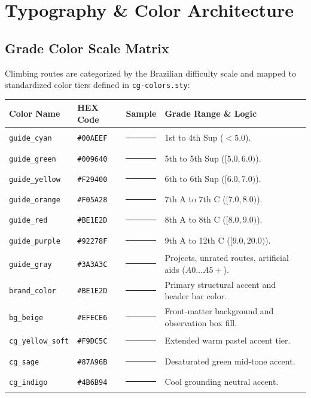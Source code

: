 \clearpage
\section{Typography \& Color Architecture}

\subsection{Grade Color Scale Matrix}
Climbing routes are categorized by the Brazilian difficulty scale and mapped to standardized color tiers defined in \texttt{cg-colors.sty}:

\vspace{0.5em}
\noindent
{\small
\begin{tabularx}{\linewidth}{@{}llcX@{}}
\toprule
\textbf{Color Name} & \textbf{HEX Code} & \textbf{Sample} & \textbf{Grade Range \& Logic} \\
\midrule
\texttt{guide\_cyan}   & \texttt{\#00AEEF} & \textcolor{guide_cyan}{\rule{14mm}{3mm}}   & 1st to 4th Sup ($< 5.0$). \\
\texttt{guide\_green}  & \texttt{\#009640} & \textcolor{guide_green}{\rule{14mm}{3mm}}  & 5th to 5th Sup ($[5.0, 6.0)$). \\
\texttt{guide\_yellow} & \texttt{\#F29400} & \textcolor{guide_yellow}{\rule{14mm}{3mm}} & 6th to 6th Sup ($[6.0, 7.0)$). \\
\texttt{guide\_orange} & \texttt{\#F05A28} & \textcolor{guide_orange}{\rule{14mm}{3mm}} & 7th A to 7th C ($[7.0, 8.0)$). \\
\texttt{guide\_red}    & \texttt{\#BE1E2D} & \textcolor{guide_red}{\rule{14mm}{3mm}}    & 8th A to 8th C ($[8.0, 9.0)$). \\
\texttt{guide\_purple} & \texttt{\#92278F} & \textcolor{guide_purple}{\rule{14mm}{3mm}} & 9th A to 12th C ($[9.0, 20.0)$). \\
\texttt{guide\_gray}   & \texttt{\#3A3A3C} & \textcolor{guide_gray}{\rule{14mm}{3mm}}   & Projects, unrated routes, artificial aids ($A0\dots A5+$). \\
\texttt{brand\_color}  & \texttt{\#BE1E2D} & \textcolor{brand_color}{\rule{14mm}{3mm}}  & Primary structural accent and header bar color. \\
\texttt{bg\_beige}     & \texttt{\#EFECE6} & \textcolor{bg_beige}{\rule{14mm}{3mm}}     & Front-matter background and observation box fill. \\
\texttt{cg\_yellow\_soft} & \texttt{\#F9DC5C} & \textcolor{cg_yellow_soft}{\rule{14mm}{3mm}} & Extended warm pastel accent tier. \\
\texttt{cg\_sage}      & \texttt{\#87A96B} & \textcolor{cg_sage}{\rule{14mm}{3mm}}      & Desaturated green mid-tone accent. \\
\texttt{cg\_indigo}    & \texttt{\#4B6B94} & \textcolor{cg_indigo}{\rule{14mm}{3mm}}    & Cool grounding neutral accent. \\
\bottomrule
\end{tabularx}
}

